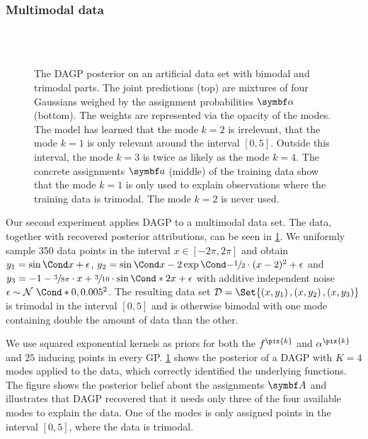 \subsubsection{Multimodal data}
\label{toc:data_association:semi_bimodal}
%
\begin{figure}[tp]
    \centering
    \\%
    \vspace{\figureskip}%
    \\%
    \vspace{\figureskip}%
    \caption[DAGP multimodality experiment]{
        \label{fig:data_association:semi_bimodal}
        The DAGP posterior on an artificial data set with bimodal and trimodal parts.
        The joint predictions (top) are mixtures of four Gaussians weighed by the assignment probabilities $\mat{\alpha}$ (bottom).
        The weights are represented via the opacity of the modes.
        The model has learned that the mode $k = 2$ is irrelevant, that the mode $k = 1$ is only relevant around the interval $[0, 5]$.
        Outside this interval, the mode $k = 3$ is twice as likely as the mode $k = 4$.
        The concrete assignments $\mat{a}$ (middle) of the training data show that the mode $k = 1$ is only used to explain observations where the training data is trimodal.
        The mode $k = 2$ is never used.
    }
\end{figure}
%
Our second experiment applies DAGP to a multimodal data set.
The data, together with recovered posterior attributions, can be seen in \cref{fig:data_association:semi_bimodal}.
We uniformly sample 350 data points in the interval $x \in [-2\pi, 2\pi]$ and obtain $y_1 = \Fun{\sin}{x} + \epsilon$, $y_2 = \Fun{\sin}{x} - 2 \Fun{\exp}{-\sfrac{1}{2} \cdot (x-2)^2} + \epsilon$ and $y_3 = -1 - \sfrac{3}{8\pi} \cdot x + \sfrac{3}{10} \cdot \Fun*{\sin}{2x} + \epsilon$ with additive independent noise $\epsilon \sim \Gaussian*{0, 0.005^2}$.
The resulting data set $\Dc = \Set{\left( x, y_1 \right), \left( x, y_2 \right), \left( x, y_3 \right)}$ is trimodal in the interval $[0, 5]$ and is otherwise bimodal with one mode containing double the amount of data than the other.

We use squared exponential kernels as priors for both the $f^{\pix{k}}$ and $\alpha^{\pix{k}}$ and $25$ inducing points in every GP.
\cref{fig:data_association:semi_bimodal} shows the posterior of a DAGP with $K = 4$ modes applied to the data, which correctly identified the underlying functions.
The figure shows the posterior belief about the assignments $\mat{A}$ and illustrates that DAGP recovered that it needs only three of the four available modes to explain the data.
One of the modes is only assigned points in the interval $[0, 5]$, where the data is trimodal.

